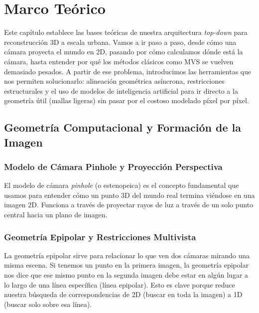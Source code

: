 \chapter{Marco Teórico}

Este capítulo establece las bases teóricas de nuestra arquitectura \textit{top-down} para reconstrucción 3D a escala urbana. Vamos a ir paso a paso, desde cómo una cámara proyecta el mundo en 2D, pasando por cómo calculamos dónde está la cámara, hasta entender por qué los métodos clásicos como MVS se vuelven demasiado pesados. A partir de ese problema, introducimos las herramientas que nos permiten solucionarlo: alineación geométrica asíncrona, restricciones estructurales y el uso de modelos de inteligencia artificial para ir directo a la geometría útil (mallas ligeras) sin pasar por el costoso modelado píxel por píxel.


\section{Geometría Computacional y Formación de la Imagen}

\subsection{Modelo de Cámara Pinhole y Proyección Perspectiva}
El modelo de cámara \textit{pinhole} (o estenopeica) es el concepto fundamental que usamos para entender cómo un punto 3D del mundo real termina viéndose en una imagen 2D. Funciona a través de proyectar rayos de luz a través de un solo punto central hacia un plano de imagen. 


\subsection{Geometría Epipolar y Restricciones Multivista}
La geometría epipolar sirve para relacionar lo que ven dos cámaras mirando una misma escena. Si tenemos un punto en la primera imagen, la geometría epipolar nos dice que ese mismo punto en la segunda imagen debe estar en algún lugar a lo largo de una línea específica (línea epipolar). Esto es clave porque reduce nuestra búsqueda de correspondencias de 2D (buscar en toda la imagen) a 1D (buscar solo sobre esa línea).

